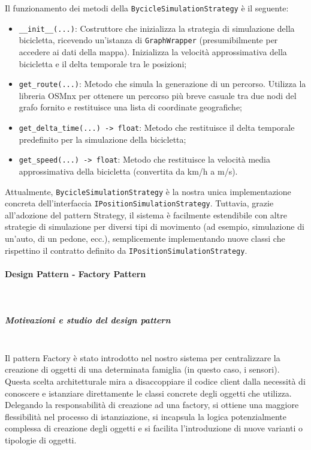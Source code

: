 \documentclass[10pt]{article}
\newcommand{\myparagraph}[1]{\paragraph{#1}\mbox{}\\}
\newcommand{\mysubparagraph}[1]{\subparagraph{#1}\mbox{}\\}
\begin{document}
    Il funzionamento dei metodi della \texttt{BycicleSimulationStrategy} è il seguente:
    \begin{itemize}
        \item \texttt{\_\_init\_\_(...)}: Costruttore che inizializza la strategia di simulazione della bicicletta, ricevendo un'istanza di \texttt{GraphWrapper} (presumibilmente per accedere ai dati della mappa). Inizializza la velocità approssimativa della bicicletta e il delta temporale tra le posizioni;
        \item \texttt{get\_route(...)}: Metodo che simula la generazione di un percorso. Utilizza la libreria OSMnx per ottenere un percorso più breve casuale tra due nodi del grafo fornito e restituisce una lista di coordinate geografiche;
        \item \texttt{get\_delta\_time(...) -> float}: Metodo che restituisce il delta temporale predefinito per la simulazione della bicicletta;
        \item \texttt{get\_speed(...) -> float}: Metodo che restituisce la velocità media approssimativa della bicicletta (convertita da km/h a m/s).
    \end{itemize}
    Attualmente, \texttt{BycicleSimulationStrategy} è la nostra unica implementazione concreta dell'interfaccia \texttt{IPositionSimulationStrategy}. Tuttavia, grazie all'adozione del pattern Strategy, il sistema è facilmente estendibile con altre strategie di simulazione per diversi tipi di movimento (ad esempio, simulazione di un'auto, di un pedone, ecc.), semplicemente implementando nuove classi che rispettino il contratto definito da \texttt{IPositionSimulationStrategy}.

\myparagraph{Design Pattern - Factory Pattern}

    \mysubparagraph{Motivazioni e studio del design pattern}
    Il pattern Factory è stato introdotto nel nostro sistema per centralizzare la creazione di oggetti di una determinata famiglia (in questo caso, i sensori). Questa scelta architetturale mira a disaccoppiare il codice client dalla necessità di conoscere e istanziare direttamente le classi concrete degli oggetti che utilizza. Delegando la responsabilità di creazione ad una factory, si ottiene una maggiore flessibilità nel processo di istanziazione, si incapsula la logica potenzialmente complessa di creazione degli oggetti e si facilita l'introduzione di nuove varianti o tipologie di oggetti.
\end{document}
